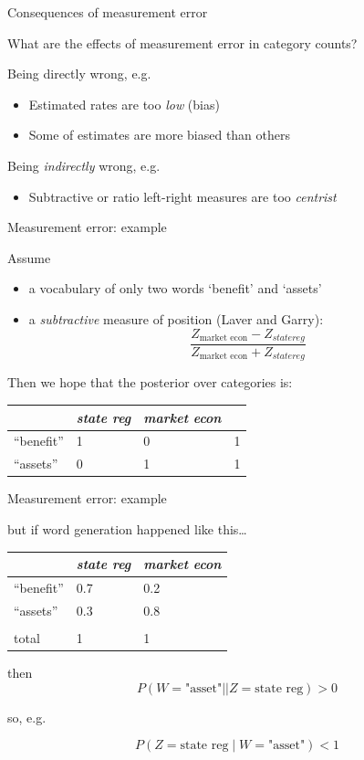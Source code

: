 \documentclass{hertieteaching}
\begin{document}
\begin{frame}{Consequences of measurement error}
\protect\hypertarget{consequences-of-measurement-error}{}

What are the effects of measurement error in category counts?

Being directly wrong, e.g.

\begin{itemize}
\item
  Estimated rates are too \emph{low} (bias)\item
  Some of estimates are more biased than others
\end{itemize}

Being \emph{indirectly} wrong, e.g.

\begin{itemize}
\item
  Subtractive or ratio left-right measures are too \emph{centrist}
\end{itemize}

\end{frame}

\begin{frame}{Measurement error: example}
\protect\hypertarget{measurement-error-example}{}

Assume

\begin{itemize}
\item
  a vocabulary of only two words `benefit' and `assets'\item
  a \emph{subtractive} measure of position (Laver and Garry): \[
  \frac{Z_\text{market econ} - Z_{state reg}}
       {Z_\text{market econ} + Z_{state reg}}
  \]
\end{itemize}

Then we hope that the posterior over categories is:

\begin{longtable}[]{@{}llll@{}}
\toprule
& \emph{state reg} & \emph{market econ} &\tabularnewline
\midrule
\endhead
``benefit'' & 1 & 0 & 1\tabularnewline
``assets'' & 0 & 1 & 1\tabularnewline
\bottomrule
\end{longtable}

\end{frame}

\begin{frame}{Measurement error: example}
\protect\hypertarget{measurement-error-example-1}{}

but if word generation happened like this\ldots{}

\begin{longtable}[]{@{}lll@{}}
\toprule
& \emph{state reg} & \emph{market econ}\tabularnewline
\midrule
\endhead
``benefit'' & 0.7 & 0.2\tabularnewline
``assets'' & 0.3 & 0.8\tabularnewline
& &\tabularnewline
total & 1 & 1\tabularnewline
\bottomrule
\end{longtable}

then \[
P(W=\text{"asset"} |\mid Z=\text{state reg}) > 0
\]

so, e.g.

\[
P(Z=\text{state reg} \mid W=\text{"asset"}) < 1
\]

\end{frame}
\end{document}
